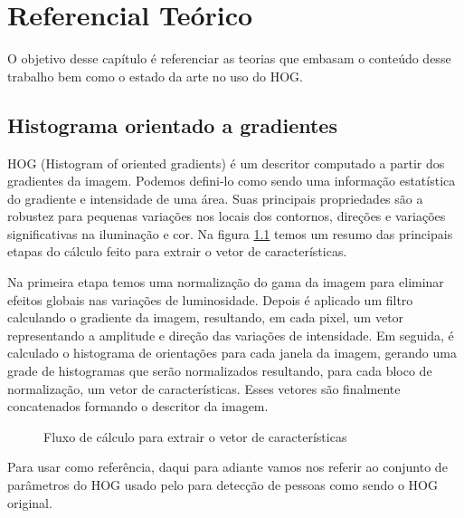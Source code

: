 \chapter{Referencial Teórico}

O objetivo desse capítulo é referenciar as teorias que embasam o conteúdo desse trabalho bem como o estado da arte no uso do HOG.

\section{Histograma orientado a gradientes}
\label{sec:HOG}

HOG (Histogram of oriented gradients) é um descritor computado a partir dos gradientes da imagem. Podemos defini-lo como sendo uma informação estatística do gradiente e intensidade de uma área. Suas principais propriedades são a robustez para pequenas variações nos locais dos contornos, direções e variações significativas na iluminação e cor. Na figura \ref{fig:hog} temos um resumo das principais etapas do cálculo feito para extrair o vetor de características.

Na primeira etapa temos uma normalização do gama da imagem para eliminar efeitos globais nas variações de luminosidade. Depois é aplicado um filtro calculando o gradiente da imagem, resultando, em cada pixel, um vetor representando a amplitude e direção das variações de intensidade. Em seguida, é calculado o histograma de orientações para cada janela da imagem, gerando uma grade de histogramas que serão normalizados resultando, para cada bloco de normalização, um vetor de características. Esses vetores são finalmente concatenados formando o descritor da imagem.

\begin{figure}[ht!]
\centering
{}
  \caption{Fluxo de cálculo para extrair o vetor de características}
  \label{fig:hog}
\end{figure}

Para usar como referência, daqui para adiante vamos nos referir ao conjunto de parâmetros do HOG usado pelo  para detecção de pessoas como sendo o HOG original.


